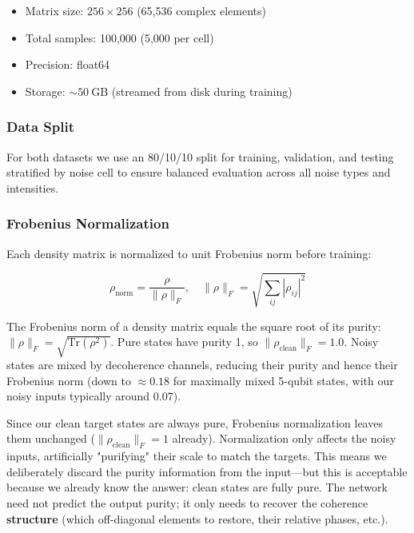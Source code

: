 \documentclass[11pt]{article}
\begin{document}
\begin{itemize}
\item Matrix size: \(256 \times 256\) (65,536 complex elements)
\item Total samples: 100,000 (5,000 per cell)
\item Precision: float64
\item Storage: \(\sim 50\ \mathrm{GB}\) (streamed from disk during training)
\end{itemize}

\subsubsection{Data Split}
\label{sec:orgd7ac88f}

For both datasets we use an 80/10/10 split for training, validation, and testing stratified by noise cell to ensure balanced evaluation across all noise types and intensities.

\subsubsection{Frobenius Normalization}
\label{sec:orgb95448d}

Each density matrix is normalized to unit Frobenius norm before training:

\begin{equation}
\rho_{\text{norm}} = \frac{\rho}{\|\rho\|_F}, \quad \|\rho\|_F = \sqrt{\sum_{ij} |\rho_{ij}|^2}
\end{equation}

The Frobenius norm of a density matrix equals the square root of its purity: \(\|\rho\|_F = \sqrt{\mathrm{Tr}(\rho^2)}\). Pure states have purity 1, so \(\|\rho_{\text{clean}}\|_F = 1.0\). Noisy states are mixed by decoherence channels, reducing their purity and hence their Frobenius norm (down to \(\approx 0.18\) for maximally mixed 5-qubit states, with our noisy inputs typically around 0.07).

Since our clean target states are always pure, Frobenius normalization leaves them unchanged (\(\|\rho_{\text{clean}}\|_F = 1\) already). Normalization only affects the noisy inputs, artificially "purifying" their scale to match the targets. This means we deliberately discard the purity information from the input---but this is acceptable because we already know the answer: clean states are fully pure. The network need not predict the output purity; it only needs to recover the coherence \textbf{structure} (which off-diagonal elements to restore, their relative phases, etc.).
\end{document}
